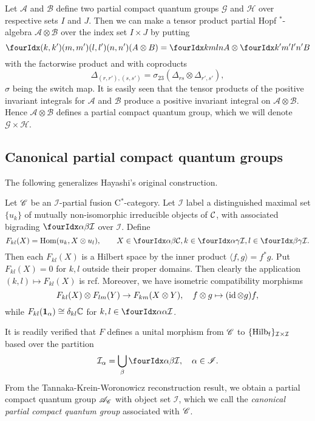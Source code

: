 
\begin{Exa} Let $\mathscr{A}$ and $\mathscr{B}$ define two partial compact quantum groups $\mathscr{G}$ and $\mathscr{H}$ over respective sets $I$ and $J$. Then we can make a tensor product partial Hopf $^*$-algebra $\mathscr{A}\otimes \mathscr{B}$ over the index set $I\times J$ by putting \[\Gr{(A\otimes B)}{(k,k')}{(l,l')}{(m,m')}{(n,n')} = \Gr{A}{k}{l}{m}{n}\otimes \Gr{B}{k'}{l'}{m'}{n'}\] with the factorwise product and with coproducts \[\Delta_{(r,r'),(s,s')} = \sigma_{23}(\Delta_{rs}\otimes \Delta_{r',s'}),\] $\sigma$ being the switch map. It is easily seen that the tensor products of the positive invariant integrals for $\mathscr{A}$ and $\mathscr{B}$ produce a positive invariant integral on $\mathscr{A}\otimes \mathscr{B}$. Hence $\mathscr{A}\otimes \mathscr{B}$ defines a partial compact quantum group, which we will denote $\mathscr{G}\times \mathscr{H}$.
\end{Exa}

\subsection{Canonical partial compact quantum groups}

The following generalizes Hayashi's original construction.

\begin{Exa} 
Let $\mathscr{C}$ be an $\mathscr{I}$-partial fusion C$^*$-category. Let $\mathcal{I}$ label a distinguished maximal set $\{u_k\}$ of mutually non-isomorphic irreducible objects of $\mathcal{C}$, with associated bigrading $\Gru{\mathcal{I}}{\alpha}{\beta}$ over $\mathscr{I}$. Define \[F_{kl}(X)  = \Hom(u_k,  X\otimes u_l),\qquad X\in \Gru{\CatC}{\alpha}{\beta}, k\in \Gru{\mathcal{I}}{\alpha}{\gamma},l\in \Gru{\mathcal{I}}{\beta}{\gamma}.\] Then each $F_{kl}(X)$ is a Hilbert space by the inner product $\langle f,g\rangle = f^*g$. Put $F_{kl}(X) = 0$ for $k,l$ outside their proper domains. Then clearly the application $(k,l)\mapsto F_{kl}(X)$ is rcf. Moreover, we have isometric compatibility morphisms \[F_{kl}(X)\otimes F_{lm}(Y)\rightarrow F_{km}(X\otimes Y),\quad f\otimes g \mapsto (\operatorname{id}\otimes g)f,\] while $F_{kl}(\mathbf{1}_{\alpha}) \cong \delta_{kl} \mathbb{C}$ for $k,l\in \Gru{\mathcal{I}}{\alpha}{\alpha}$. 

It is readily verified that $F$ defines a unital morphism from $\mathscr{C}$ to $\{\mathrm{Hilb}_{\operatorname{\mathrm{f}}}\}_{\mathcal{I}\times \mathcal{I}}$ based over the partition \[\mathcal{I}_{\alpha} = \bigcup_{\beta} \Gru{\mathcal{I}}{\alpha}{\beta},\quad\alpha\in \mathscr{I}.\] From the Tannaka-Krein-Woronowicz reconstruction result, we obtain a partial compact quantum group $\mathscr{A}_{\mathscr{C}}$ with object set $\mathcal{I}$, which we call the \emph{canonical partial compact quantum group} associated with $\mathscr{C}$. 
\end{Exa} 

